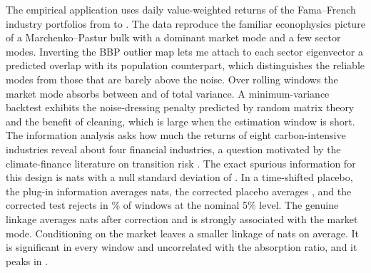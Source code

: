 The empirical application uses \NDays{} daily value-weighted returns of the \NAssets{} Fama--French industry portfolios from \SampleStart{} to \SampleEnd{} \citep{fama1997industry,french2026data}. The data reproduce the familiar econophysics picture of a Marchenko--Pastur bulk with a dominant market mode and a few sector modes. Inverting the BBP outlier map lets me attach to each sector eigenvector a predicted overlap with its population counterpart, which distinguishes the reliable modes from those that are barely above the noise. Over \NWindows{} rolling windows the market mode absorbs between \AbsMin{} and \AbsMax{} of total variance. A minimum-variance backtest exhibits the noise-dressing penalty predicted by random matrix theory and the benefit of cleaning, which is large when the estimation window is short. The information analysis asks how much the returns of eight carbon-intensive industries reveal about four financial industries, a question motivated by the climate-finance literature on transition risk \citep{battiston2017climate,bolton2021investors,giglio2021climate}. The exact spurious information for this design is \MIBias{} nats with a null standard deviation of \MISd{}. In a time-shifted placebo, the plug-in information averages \MINullPlugMean{} nats, the corrected placebo averages \MINullCorrMean{}, and the corrected test rejects in \MINullRej\% of windows at the nominal 5\% level. The genuine linkage averages \MICorrMean{} nats after correction and is strongly associated with the market mode. Conditioning on the market leaves a smaller linkage of \MIPartialMean{} nats on average. It is significant in every window and uncorrelated with the absorption ratio, and it peaks in \MIPartialMaxDate{}.

